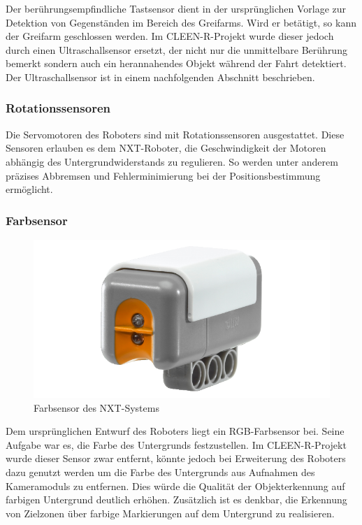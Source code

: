 Der berührungsempfindliche Tastsensor dient in der ursprünglichen Vorlage zur Detektion von Gegenständen im Bereich des Greifarms. Wird er betätigt, so kann der Greifarm geschlossen werden. Im CLEEN-R-Projekt wurde dieser jedoch durch einen Ultraschallsensor ersetzt, der nicht nur die unmittelbare Berührung bemerkt sondern auch ein herannahendes Objekt während der Fahrt detektiert. Der Ultraschallsensor ist in einem nachfolgenden Abschnitt beschrieben.

\subsubsection{Rotationssensoren}

Die Servomotoren des Roboters sind mit Rotationssensoren ausgestattet. Diese Sensoren erlauben es dem NXT-Roboter, die Geschwindigkeit der Motoren abhängig des Untergrundwiderstands zu regulieren. So werden unter anderem präzises Abbremsen und Fehlerminimierung bei der Positionsbestimmung ermöglicht.

\subsubsection{Farbsensor}

\begin{figure}[h]
\centering
\includegraphics[width=\textwidth/3]{Bilder/Robot/color_sensor}
\caption{Farbsensor des NXT-Systems}
\label{fig:colorSensor}
\end{figure}

Dem ursprünglichen Entwurf des Roboters liegt ein RGB-Farbsensor bei. Seine Aufgabe war es, die Farbe des Untergrunds festzustellen. Im CLEEN-R-Projekt wurde dieser Sensor zwar entfernt, könnte jedoch bei Erweiterung des Roboters dazu genutzt werden um die Farbe des Untergrunds aus Aufnahmen des Kameramoduls zu entfernen. Dies würde die Qualität der Objekterkennung auf farbigen Untergrund deutlich erhöhen. Zusätzlich ist es denkbar, die Erkennung von Zielzonen über farbige Markierungen auf dem Untergrund zu realisieren.

